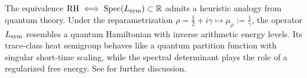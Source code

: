 \begin{remark}
\label{rmk:spectral_physics_analogy}
The equivalence \(\mathrm{RH} \iff \operatorname{Spec}(L_{\mathrm{sym}}) \subset \mathbb{R}\) admits a heuristic analogy from quantum theory. Under the reparametrization \(\rho = \tfrac{1}{2} + i\gamma \mapsto \mu_\rho := \tfrac{1}{\gamma}\), the operator \(L_{\mathrm{sym}}\) resembles a quantum Hamiltonian with inverse arithmetic energy levels. Its trace-class heat semigroup behaves like a quantum partition function with singular short-time scaling, while the spectral determinant plays the role of a regularized free energy. See  for further discussion.
\end{remark}
